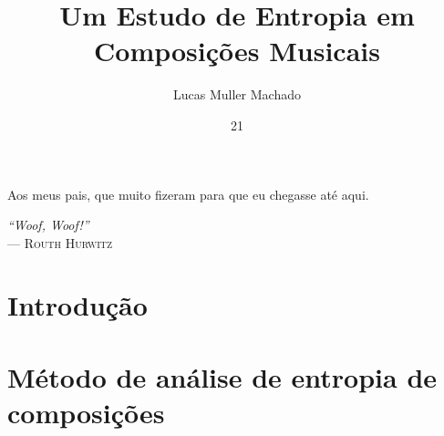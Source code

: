 \documentclass[tg]{ita}    %
\author{Lucas Muller Machado}{de Oliveira}
\title{Um Estudo de Entropia em Composições Musicais}
\date{21}{novembro}{2017}
\begin{document}
\maketitle

\begin{itadedication}
Aos meus pais, que muito fizeram para que eu chegasse até aqui.
\end{itadedication}

\begin{itathanks}

\end{itathanks}

\thispagestyle{empty}
\ifhyperref{}\fi
\begin{flushright}
\begin{spacing}{1}
\mbox{}\vfill
{\sffamily\itshape
``Woof, Woof!''\\}
--- \textsc{Routh Hurwitz  }
\end{spacing}
\end{flushright}

\begin{abstract}

\end{abstract}

\begin{englishabstract}

\end{englishabstract}

\listoffigures %

\listoftables %

\listofabbreviations

\listofsymbols

\tableofcontents

\mainmatter

\chapter{Introdução}


\chapter{Método de análise de entropia de composições}

\end{document}
